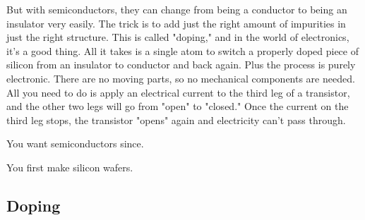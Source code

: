   But with semiconductors, they can change from being a conductor to being an insulator very easily. The trick is to add just the right amount of impurities in just the right structure. This is called "doping," and in the world of electronics, it's a good thing. All it takes is a single atom to switch a properly doped piece of silicon from an insulator to conductor and back again. Plus the process is purely electronic. There are no moving parts, so no mechanical components are needed. All you need to do is apply an electrical current to the third leg of a transistor, and the other two legs will go from "open" to "closed." Once the current on the third leg stops, the transistor "opens" again and electricity can't pass through. 

  You want semiconductors since. 

  You first make silicon wafers. 

\subsection{Doping}


